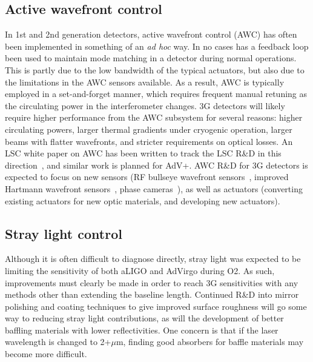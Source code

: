 \subsection{Active wavefront control}
In 1st and 2nd generation detectors, active wavefront control (AWC) has often been implemented in something of an \emph{ad hoc} way. In no cases has a feedback loop been used to maintain mode matching in a detector during normal operations. This is partly due to the low bandwidth of the typical actuators, but also due to the limitations in the AWC sensors available. As a result, AWC is typically employed in a set-and-forget manner, which requires frequent manual retuning as the circulating power in the interferometer changes. 3G detectors will likely require higher performance from the AWC subsystem for several reasons: higher circulating powers, larger thermal gradients under cryogenic operation, larger beams with flatter wavefronts, and stricter requirements on optical losses. An LSC white paper on AWC has been written to track the LSC R\&D in this direction~\cite{aLIGO_AWC}, and similar work is planned for AdV+. AWC R\&D for 3G detectors is expected to focus on new sensors (RF bullseye wavefront sensors~\cite{bullseye}, improved Hartmann wavefront sensors~\cite{HWS}, phase cameras~\cite{phasecam}), as well as actuators (converting existing actuators for new optic materials, and developing new actuators). 

\subsection{Stray light control}
Although it is often difficult to diagnose directly, stray light was expected to be  limiting the sensitivity of both aLIGO and AdVirgo during O2. As such, improvements must clearly be made in order to reach 3G sensitivities with any methods other than extending the baseline length. Continued R\&D into mirror polishing and coating techniques to give improved surface roughness will go some way to reducing stray light contributions, as will the development of better baffling materials with lower reflectivities. One concern is that if the laser wavelength is changed to 2+$\mu$m, finding good absorbers for baffle materials may become more difficult. 

